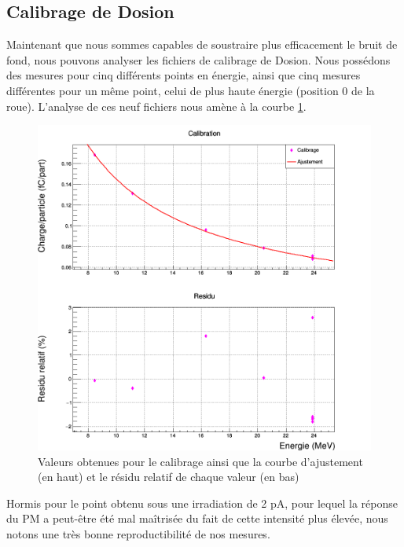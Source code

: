 \documentclass[a4paper,11pt]{article}
\begin{document}
\subsection*{Calibrage de Dosion}
Maintenant que nous sommes capables de soustraire plus efficacement le bruit de fond, nous pouvons analyser les fichiers de calibrage de Dosion.
Nous possédons des mesures pour cinq différents points en énergie, ainsi que cinq mesures différentes pour un même point, celui de plus haute énergie (position 0 de la roue). 
L'analyse de ces neuf fichiers nous amène à la courbe \ref{fig:calibp}.
\begin{figure}[h]
\begin{center}
\includegraphics[scale=0.4]{Calibrationp.png} 
\caption{\label{fig:calibp}\footnotesize{Valeurs obtenues pour le calibrage ainsi que la courbe d'ajustement (en haut) et le résidu relatif de chaque valeur (en bas)}}
\end{center}
\end{figure}

Hormis pour le point obtenu sous une irradiation de 2 pA, pour lequel la réponse du PM a peut-être été mal maîtrisée du fait de cette intensité plus élevée, nous notons une très bonne reproductibilité de nos mesures.
\end{document}
